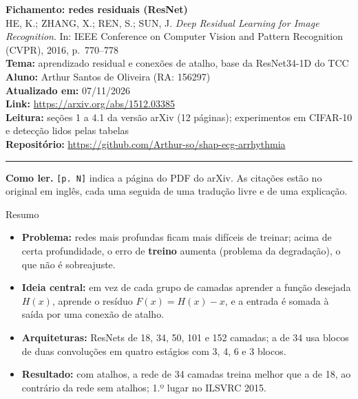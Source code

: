 \documentclass[11pt,a4paper]{article}
\begin{document}
\begin{center}
    {\LARGE \textbf{Fichamento: redes residuais (ResNet)}} \\[0.35em]
    {\large HE, K.; ZHANG, X.; REN, S.; SUN, J. \textit{Deep Residual Learning for Image Recognition}. In: IEEE Conference on Computer Vision and Pattern Recognition (CVPR), 2016, p.~770--778} \\[0.3em]
    \textbf{Tema:} aprendizado residual e conexões de atalho, base da ResNet34-1D do TCC \\[0.2em]
    \textbf{Aluno:} Arthur Santos de Oliveira (RA: 156297) \\[0.2em]
    \textbf{Atualizado em:} 07/11/2026 \\[0.2em]
    \textbf{Link:} \url{https://arxiv.org/abs/1512.03385} \\[0.2em]
    \textbf{Leitura:} seções 1 a 4.1 da versão arXiv (12 páginas); experimentos em CIFAR-10 e detecção lidos pelas tabelas \\[0.2em]
    \textbf{Repositório:} \url{https://github.com/Arthur-so/shap-ecg-arrhythmia}
\end{center}
\vspace{-0.5em}
\hrule
\vspace{0.8em}

\textbf{Como ler.} \texttt{[p. N]} indica a página do PDF do arXiv. As citações estão no original em inglês, cada uma seguida de uma tradução livre e de uma explicação.

\begin{infobox}[note]{Resumo}
\begin{itemize}
\item \textbf{Problema:} redes mais profundas ficam mais difíceis de treinar; acima de certa profundidade, o erro de \textbf{treino} aumenta (problema da degradação), o que não é sobreajuste.
\item \textbf{Ideia central:} em vez de cada grupo de camadas aprender a função desejada $H(x)$, aprende o resíduo $F(x) = H(x) - x$, e a entrada é somada à saída por uma conexão de atalho.
\item \textbf{Arquiteturas:} ResNets de 18, 34, 50, 101 e 152 camadas; a de 34 usa blocos de duas convoluções em quatro estágios com 3, 4, 6 e 3 blocos.
\item \textbf{Resultado:} com atalhos, a rede de 34 camadas treina melhor que a de 18, ao contrário da rede sem atalhos; 1.º lugar no ILSVRC 2015.
\end{itemize}
\end{infobox}
\end{document}
